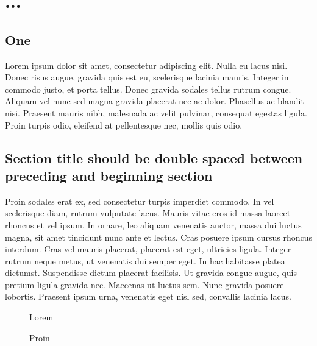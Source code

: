 \chapter{...}	%

\section{One}
Lorem ipsum dolor sit amet, consectetur adipiscing elit. Nulla eu lacus nisi. Donec risus augue, gravida quis est eu, scelerisque lacinia mauris. Integer in commodo justo, et porta tellus. Donec gravida sodales tellus rutrum congue. Aliquam vel nunc sed magna gravida placerat nec ac dolor. Phasellus ac blandit nisi. Praesent mauris nibh, malesuada ac velit pulvinar, consequat egestas ligula. Proin turpis odio, eleifend at pellentesque nec, mollis quis odio.

\section{Section title should be double spaced between preceding and beginning section}
Proin sodales erat ex, sed consectetur turpis imperdiet commodo. In vel scelerisque diam, rutrum vulputate lacus. Mauris vitae eros id massa laoreet rhoncus et vel ipsum. In ornare, leo aliquam venenatis auctor, massa dui luctus magna, sit amet tincidunt nunc ante et lectus. Cras posuere ipsum cursus rhoncus interdum. Cras vel mauris placerat, placerat est eget, ultricies ligula. Integer rutrum neque metus, ut venenatis dui semper eget. In hac habitasse platea dictumst. Suspendisse dictum placerat facilisis. Ut gravida congue augue, quis pretium ligula gravida nec. Maecenas ut luctus sem. Nunc gravida posuere lobortis. Praesent ipsum urna, venenatis eget nisl sed, convallis lacinia lacus.


\begin{figure}
	\centering
	 \caption{Lorem}
\end{figure}

\begin{figure}
	\centering
	 \caption{Proin}
\end{figure}


\endinput